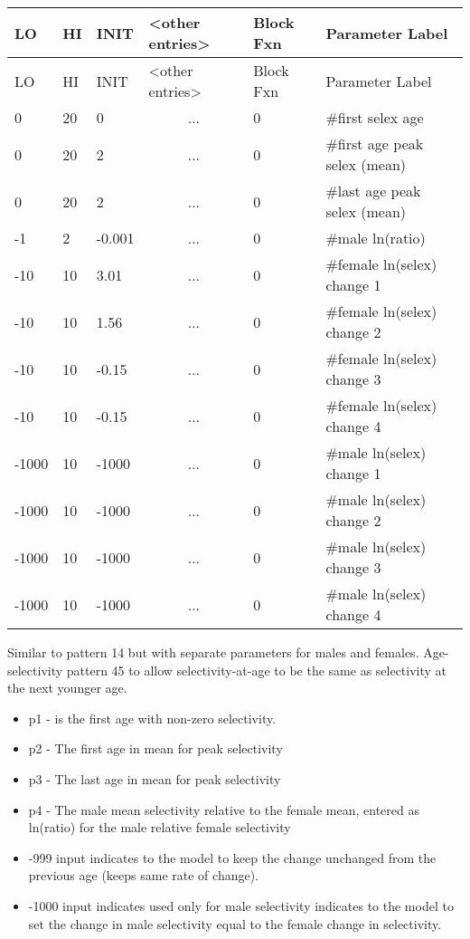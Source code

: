 	\begin{longtable}{p{1cm} p{1cm} p{1cm} p{2.9cm}  p{1.8cm}  p{5.1cm}}
		\hline
		LO \Tstrut & HI & INIT  &  <other entries> & Block Fxn & Parameter Label\Bstrut\\
		\hline
		\endfirsthead
	
		\hline
		LO \Tstrut & HI & INIT & <other entries> & Block Fxn & Parameter Label\Bstrut\\
		\hline
		\endhead

		0     & 20 &  0     & \multicolumn{1}{c}{...} & 0 & \#first selex age \Tstrut\\
		0     & 20 &  2     & \multicolumn{1}{c}{...} & 0 & \#first age peak selex (mean) \\
		0     & 20 &  2     & \multicolumn{1}{c}{...} & 0 & \#last age peak selex (mean) \\
		-1    & 2  & -0.001 & \multicolumn{1}{c}{...} & 0 & \#male ln(ratio) \\
		-10   & 10 &  3.01  & \multicolumn{1}{c}{...} & 0 & \#female ln(selex) change 1\\
		-10   & 10 &  1.56  & \multicolumn{1}{c}{...} & 0 & \#female ln(selex) change 2\\
		-10   & 10 & -0.15  & \multicolumn{1}{c}{...} & 0 & \#female ln(selex) change 3\\
		-10   & 10 & -0.15  & \multicolumn{1}{c}{...} & 0 & \#female ln(selex) change 4\\
		-1000 & 10 & -1000  & \multicolumn{1}{c}{...} & 0 & \#male ln(selex) change 1\\
		-1000 & 10 & -1000  & \multicolumn{1}{c}{...} & 0 & \#male ln(selex) change 2\\
		-1000 & 10 & -1000  & \multicolumn{1}{c}{...} & 0 & \#male ln(selex) change 3\\
		-1000 & 10 & -1000  & \multicolumn{1}{c}{...} & 0 & \#male ln(selex) change 4\Bstrut\\
		\hline
	\end{longtable}
		
Similar to pattern 14 but with separate parameters for males and females. Age-selectivity pattern 45 to allow selectivity-at-age to be the same as selectivity at the next younger age.  
	\begin{itemize}
		\item p1 - is the first age with non-zero selectivity.
		\item p2 - The first age in mean for peak selectivity
		\item p3 - The last age in mean for peak selectivity
		\item p4 - The male mean selectivity relative to the female mean, entered as ln(ratio) for the male relative female selectivity
		\item -999 input indicates to the model to keep the change unchanged from the previous age (keeps same rate of change).
		\item -1000 input indicates used only for male selectivity indicates to the model to set the change in male selectivity equal to the female change in selectivity.
	\end{itemize}
		
